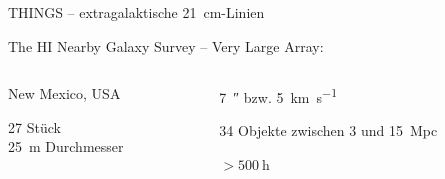 \begin{frame}[plain,t]{THINGS – extragalaktische \SI{21}{\centi\meter}-Linien}

  The H\textsc{I} Nearby Galaxy Survey – Very Large Array: 

  \begin{columns}[c, onlytextwidth]
    \begin{column}{0.4\textwidth}
      \begin{description}[Teleskope]
        \item[Ort] New Mexico, USA
        \item[Teleskope] 27 Stück \\
          \SI{25}{\meter} Durchmesser
      \end{description}
    \end{column}
    \begin{column}{0.55\textwidth}
      \begin{description}[Messdauer]
        \item[Auflösung] \SI{7}{\arcsecond} bzw. \SI{5}{\kilo\meter\per\second}
        \item[Messung] 34 Objekte zwischen  3 und \SI{15}{\mega pc}
        \item[Messdauer] $> \SI{500}{\hour}$
      \end{description}
    \end{column}
  \end{columns}
  
  
\end{frame}

